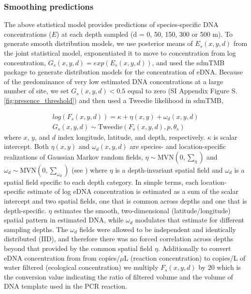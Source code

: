\documentclass{article}
\begin{document}
\subsubsection*{Smoothing predictions}

The above statistical model provides predictions of species-specific DNA concentrations ($E$) at each depth sampled (d = 0, 50, 150, 300 or 500 m). To generate smooth distribution models, we use posterior means of $E_s(x,y,d)$ from the joint statistical model, exponentiated it to move to concentration from log concentration, $G_{s}(x,y,d) = exp(E_{s}(x,y,d))$, and used the sdmTMB package \cite{anderson2022} to generate distribution models for the concentration of eDNA. Because of the predominance of very low estimated DNA concentrations at a large number of site, we set $G_{s}(x,y,d) < 0.5$ equal to zero (SI Appendix Figure S.\ref{fig:presence_threshold}) and then used a Tweedie likelihood in sdmTMB,

\begin{align} 
	 log(F_s(x,y,d)) = \kappa + \eta(x,y) + \omega_{d}(x,y,d) \\
	 G_{s}(x,y,d) \sim \mathrm{Tweedie}(F_s(x,y,d),p ,\theta_s)
\end{align}
where $x$, $y$, and $d$ index longitude, latitude, and depth, respectively.   $\kappa$ is scalar intercept. Both $\eta(x,y)$ and $\omega_d(x,y,d)$ are species- and location-specific realizations of Gaussian Markov random fields, $\eta \sim  \mathrm{MVN}(0,\sum_\eta)$ and $\omega_d \sim  \mathrm{MVN}(0,\sum_{\omega_d})$ (see \cite{anderson2022}) where $\eta$ is a depth-invariant spatial field and $\omega_d$ is a spatial field specific to each depth category. In simple terms, each location-specific estimate of log eDNA concentration is estimated as a sum of the scalar intercept and two spatial fields, one that is common across depths and one that is depth-specific. $\eta$ estimates the smooth, two-dimensional (latitude/longitude) spatial pattern in estimated DNA, while $\omega_d$ modulates that estimate for different sampling depths. The $\omega_d$ fields were allowed to be independent and identically distributed (IID), and therefore there was no forced correlation across depths beyond that provided by the common spatial field $\eta$. Additionally to convert eDNA concentration from from copies/$\mu$L (reaction concentration) to copies/L of water filtered (ecological concentration) we multiply $F_s(x,y,d)$ by 20 which is the conversion value indicating the ratio of filtered volume and the volume of DNA template used in the PCR reaction.
\end{document}
